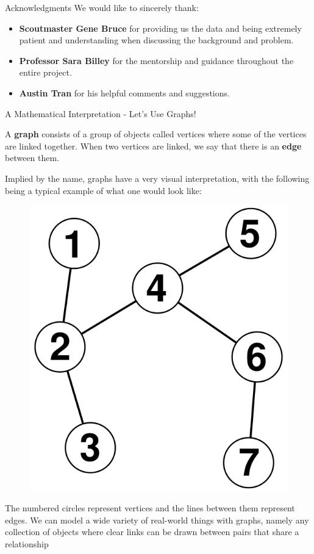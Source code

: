 \documentclass{beamer}
\begin{document}
\begin{frame}{Acknowledgments}
	We would like to sincerely thank:
	\vspace{0.2in}
	\begin{itemize}
		\item \textbf{Scoutmaster Gene Bruce} for providing us the data and being extremely patient and understanding when discussing the background and problem.
		\vspace{0.2in}
		\item \textbf{Professor Sara Billey} for the mentorship and guidance throughout the entire project.
		\vspace{0.2in}
		\item \textbf{Austin Tran} for his helpful comments and suggestions.
	\end{itemize}
\end{frame}
\begin{frame}{A Mathematical Interpretation - Let's Use Graphs!}
\begin{definition}
A \textbf{graph} consists of a group of objects called vertices where some of the vertices are linked together. When two vertices are linked, we say that there is an \textbf{edge} between them. 
\end{definition}
Implied by the name, graphs have a very visual interpretation, with the following being a typical example of what one would look like:
\begin{figure}
\centering
\includegraphics[scale=.1]{images/graph.png}
\end{figure}
The numbered circles represent vertices and the lines between them represent edges. We can model a wide variety of real-world things with graphs, namely any collection of objects where clear links can be drawn between pairs that share a relationship
\end{frame}
\end{document}
